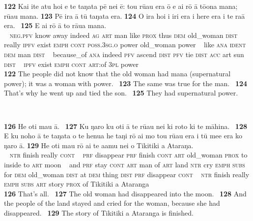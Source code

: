 \newpage 
\gll
\textbf{\textup{122}} Kai {\ꞌ}ite atu ho{\ꞌ}i e te taŋata pē nei ē: tou rū{\ꞌ}au era {\ꞌ}ō e ai rō {\ꞌ}ā tō{\ꞌ}ona mana; rū{\ꞌ}au mana. \textbf{\textup{123}} Pē ira {\ꞌ}ā tū taŋata era. \textbf{\textup{124}} {\ꞌ}O ira ho{\ꞌ}i i iri era i here era i te ra{\ꞌ}ā era. ~\textbf{\textup{125}} E ai rō {\ꞌ}ā to rāua mana.\\
~ \textsc{neg.pfv} know away indeed \textsc{ag} \textsc{art} man like \textsc{prox} thus \textsc{dem} old\_woman \textsc{dist} really \textsc{ipfv} exist \textsc{emph} \textsc{cont} \textsc{poss.3sg.o} power old\_woman power  ~ like \textsc{ana} \textsc{ident} \textsc{dem} man \textsc{dist} ~ because\_of \textsc{ana} indeed \textsc{pfv} ascend \textsc{dist} \textsc{pfv} tie \textsc{dist} \textsc{acc} art sun \textsc{dist} ~ \textsc{ipfv} exist \textsc{emph} \textsc{cont} \textsc{art}:of \textsc{3pl} power\\

\medskip\glt
\textbf{\textup{122}} The people did not know that the old woman had mana (supernatural power); it was a woman with power. ~\textbf{\textup{123}} The same was true for the man. ~\textbf{\textup{124}} That’s why he went up and tied the son. ~\textbf{\textup{125}} They had supernatural power.


~

\bigskip\gll
\textbf{\textup{126}} He oti mau {\ꞌ}ā. ~\textbf{\textup{127}} Ku ŋaro ku oti {\ꞌ}ā te rū{\ꞌ}au nei ki roto ki te māhina. ~\textbf{\textup{128}} {\ꞌ}E ku noho {\ꞌ}ā te taŋata o te henua he taŋi rō {\ꞌ}ai mo tou rū{\ꞌ}au era {\ꞌ}i tū me{\ꞌ}e era ko ŋaro {\ꞌ}ā. \textbf{\textup{129}} He oti mau rō {\ꞌ}ai te {\ꞌ}a{\ꞌ}amu nei o Tikitiki {\ꞌ}a {\ꞌ}Ataraŋa.\\
~ \textsc{ntr} finish really \textsc{cont} ~ \textsc{prf} disappear \textsc{prf} finish \textsc{cont} \textsc{art} old\_woman \textsc{prox} to inside to \textsc{art} moon ~ and \textsc{prf} stay \textsc{cont} \textsc{art} man of \textsc{art} land \textsc{ntr} cry \textsc{emph} \textsc{subs} for \textsc{dem} old\_woman \textsc{dist} at \textsc{dem} thing \textsc{dist} \textsc{prf} disappear \textsc{cont}  ~ \textsc{ntr} finish really \textsc{emph} \textsc{subs} \textsc{art} story \textsc{prox} of Tikitiki a Ataranga\\

\medskip\glt
\textbf{\textup{126}} That’s all. ~\textbf{\textup{127}} The old woman had disappeared into the moon. ~\textbf{\textup{128}} And the people of the land stayed and cried for the woman, because she had disappeared. ~\textbf{\textup{129}} The story of Tikitiki a Ataranga is finished.

